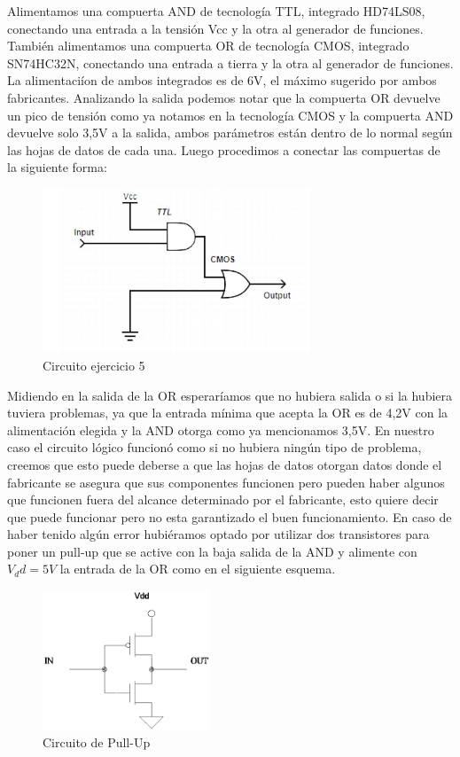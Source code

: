 ﻿
Alimentamos una compuerta AND de tecnología TTL, integrado HD74LS08, conectando una entrada a la tensión Vcc y la otra al generador de funciones. Tambi\'en alimentamos una compuerta OR de tecnología CMOS, integrado SN74HC32N, conectando una entrada a tierra y la otra al generador de funciones. La alimentaciíon de ambos integrados es de 6V, el máximo sugerido por ambos fabricantes. Analizando la salida podemos notar que la compuerta OR devuelve un pico de tensión como ya notamos en la tecnología CMOS y la compuerta AND devuelve solo 3,5V a la salida, ambos parámetros están dentro de lo normal según las hojas de datos de cada una. Luego procedimos a conectar las compuertas de la siguiente forma:

\begin{figure}[hbtp]
\centering
\includegraphics[width=8cm]{ejercicio5/E3_CirEj5.jpg}  
\caption{Circuito ejercicio 5}
\end{figure}


Midiendo en la salida de la OR esperaríamos que no hubiera salida o si la hubiera tuviera problemas, ya que la entrada mínima que acepta la OR es de 4,2V con la alimentación elegida y la AND otorga como ya mencionamos 3,5V. En nuestro caso el circuito lógico funcionó como si no hubiera ningún tipo de problema, creemos que esto puede deberse a que las hojas de datos otorgan datos donde el fabricante se asegura que sus componentes funcionen pero pueden haber algunos que funcionen fuera del alcance determinado por el fabricante, esto quiere decir que puede funcionar pero no esta garantizado el buen funcionamiento. En caso de haber tenido algún error hubi\'eramos optado por utilizar dos transistores para poner un pull-up que se active con la baja salida de la AND y alimente con $V_dd=5V$ la entrada de la OR como en el siguiente esquema.

\begin{figure}[hbtp]
\centering
\includegraphics[width=5cm]{ejercicio5/PullUp.jpg} 
\caption{Circuito de Pull-Up}
\end{figure}

